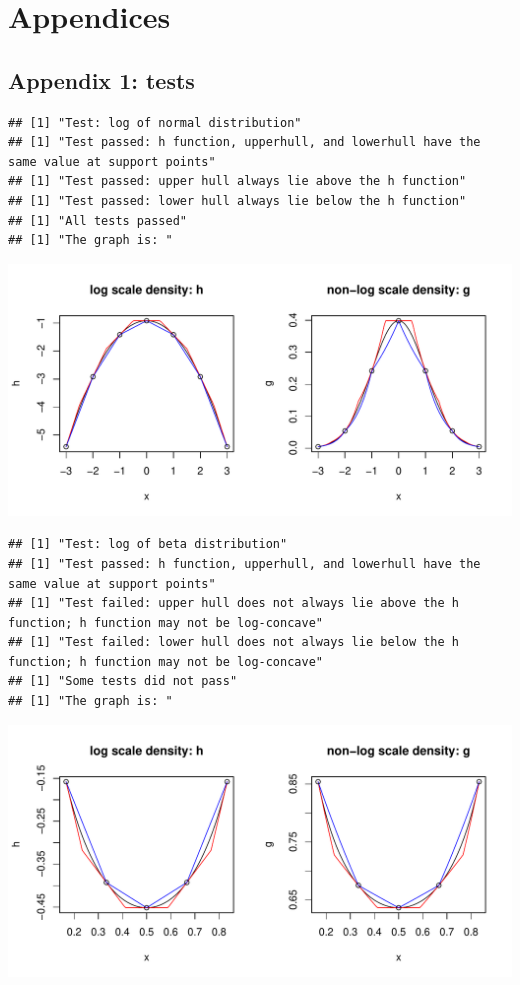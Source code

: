 \documentclass{article}\usepackage[]{graphicx}\usepackage[]{color}
\makeatletter
\def\maxwidth{ %
  \ifdim\Gin@nat@width>\linewidth
    \linewidth
  \else
    \Gin@nat@width
  \fi
}
\newenvironment{kframe}{%
 \def\at@end@of@kframe{}%
 \ifinner\ifhmode%
  \def\at@end@of@kframe{\end{minipage}}%
  \begin{minipage}{\columnwidth}%
 \fi\fi%
 \def\FrameCommand##1{\hskip\@totalleftmargin \hskip-\fboxsep
 \colorbox{shadecolor}{##1}\hskip-\fboxsep
     \hskip-\linewidth \hskip-\@totalleftmargin \hskip\columnwidth}%
 \MakeFramed {\advance\hsize-\width
   \@totalleftmargin\z@ \linewidth\hsize
   \@setminipage}}%
 {\par\unskip\endMakeFramed%
 \at@end@of@kframe}
\newenvironment{knitrout}{}{} %
\makeatother
\begin{document}
\newpage
\section{Appendices}

\subsection{Appendix 1: tests}
\begin{knitrout}
\color{fgcolor}\begin{kframe}
\begin{verbatim}
## [1] "Test: log of normal distribution"
## [1] "Test passed: h function, upperhull, and lowerhull have the same value at support points"
## [1] "Test passed: upper hull always lie above the h function"
## [1] "Test passed: lower hull always lie below the h function"
## [1] "All tests passed"
## [1] "The graph is: "
\end{verbatim}
\end{kframe}
\includegraphics[width=\maxwidth]{figure/unnamed-chunk-1-1} 
\begin{kframe}\begin{verbatim}
## [1] "Test: log of beta distribution"
## [1] "Test passed: h function, upperhull, and lowerhull have the same value at support points"
## [1] "Test failed: upper hull does not always lie above the h function; h function may not be log-concave"
## [1] "Test failed: lower hull does not always lie below the h function; h function may not be log-concave"
## [1] "Some tests did not pass"
## [1] "The graph is: "
\end{verbatim}
\end{kframe}
\includegraphics[width=\maxwidth]{figure/unnamed-chunk-1-2} 

\end{knitrout}
\end{document}
